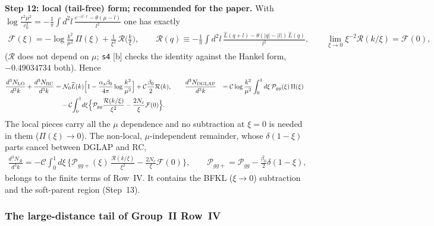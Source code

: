 \documentclass[10pt]{article}
\begin{document}
\medskip
\noindent\textbf{Step 12: local (tail-free) form; recommended for the paper.} With $\log\frac{r^{2}\mu^{2}}{c_{0}^{2}}=-\frac{1}{\pi}\int d^{2}l\,\frac{e^{-il\cdot r}-\theta(\mu-l)}{l^{2}}$ one has exactly
\begin{align}
\mathcal{F}(\xi)=-\log\frac{k^{2}}{\mu^{2}}\,\Pi(\xi)+\frac{1}{\xi^{2}}\,\mathcal{R}\Big(\frac{k}{\xi}\Big),\qquad
\mathcal{R}(q)\equiv-\frac{1}{\pi}\int d^{2}l\,\frac{\widehat{L}(q+l)-\theta(|q|-|l|)\,\widehat{L}(q)}{l^{2}},\qquad\lim_{\xi\to0}\xi^{-2}\mathcal{R}(k/\xi)=\mathcal{F}(0),
\label{eq:pd-loc}
\end{align}
($\mathcal{R}$ does not depend on $\mu$; \texttt{s4} [b] checks the identity against the Hankel form, $-0.49034734$ both). Hence
\begin{align}
\frac{d^{3}N_{\rm LO}}{d^{3}k}+\frac{d^{3}N_{\rm RC}}{d^{3}k}&=\mathcal{N}_{0}\widehat{L}(k)\Big[1-\frac{\alpha_{s}\beta_{0}}{4\pi}\log\frac{k^{2}}{\mu^{2}}\Big]+\mathcal{C}\frac{\beta_{0}}{2}\mathcal{R}(k),\qquad
\frac{d^{3}N_{\rm DGLAP}}{d^{3}k}&=\mathcal{C}\log\frac{k^{2}}{\mu^{2}}\int_{0}^{1}d\xi\,\mathcal{P}_{gg}(\xi)\,\Pi(\xi)\notag\\&\quad-\mathcal{C}\!\int_{0}^{1}\!d\xi\Big\{\mathcal{P}_{gg}\frac{\mathcal{R}(k/\xi)}{\xi^{2}}-\frac{2N_{c}}{\xi}\mathcal{F}(0)\Big\}.
\notag
\end{align}
The local pieces carry all the $\mu$ dependence and no subtraction at $\xi=0$ is needed in them ($\Pi(\xi)\to0$). The non-local, $\mu$-independent remainder, whose $\delta(1-\xi)$ parts cancel between DGLAP and RC,
\begin{align}
\frac{d^{3}N_{\mathcal{R}}}{d^{3}k}=-\mathcal{C}\int_{0}^{1}d\xi\,\Big\{\mathcal{P}_{gg+}(\xi)\,\frac{\mathcal{R}(k/\xi)}{\xi^{2}}-\frac{2N_{c}}{\xi}\mathcal{F}(0)\Big\},\qquad\mathcal{P}_{gg+}=\mathcal{P}_{gg}-\frac{\beta_{0}}{2}\delta(1-\xi),
\label{eq:pd-R}
\end{align}
belongs to the finite terms of Row~IV. It contains the BFKL ($\xi\to0$) subtraction and the soft-parent region (Step~13).

\subsubsection{The large-distance tail of Group~II Row~IV}
\end{document}
